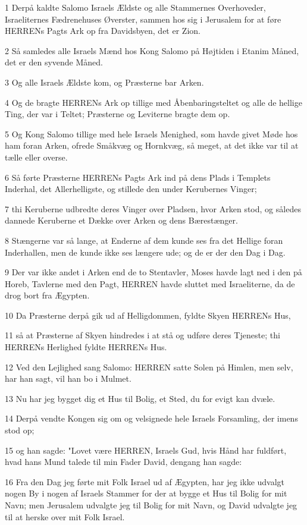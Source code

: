 \par 1 Derpå kaldte Salomo Israels Ældste og alle Stammernes Overhoveder, Israeliternes Fædrenehuses Øverster, sammen hos sig i Jerusalem for at føre HERRENs Pagts Ark op fra Davidsbyen, det er Zion.
\par 2 Så samledes alle Israels Mænd hos Kong Salomo på Højtiden i Etanim Måned, det er den syvende Måned.
\par 3 Og alle Israels Ældste kom, og Præsterne bar Arken.
\par 4 Og de bragte HERRENs Ark op tillige med Åbenbaringsteltet og alle de hellige Ting, der var i Teltet; Præsterne og Leviterne bragte dem op.
\par 5 Og Kong Salomo tillige med hele Israels Menighed, som havde givet Møde hos ham foran Arken, ofrede Småkvæg og Hornkvæg, så meget, at det ikke var til at tælle eller overse.
\par 6 Så førte Præsterne HERRENs Pagts Ark ind på dens Plads i Templets Inderhal, det Allerhelligste, og stillede den under Kerubernes Vinger;
\par 7 thi Keruberne udbredte deres Vinger over Pladsen, hvor Arken stod, og således dannede Keruberne et Dække over Arken og dens Bærestænger.
\par 8 Stængerne var så lange, at Enderne af dem kunde ses fra det Hellige foran Inderhallen, men de kunde ikke ses længere ude; og de er der den Dag i Dag.
\par 9 Der var ikke andet i Arken end de to Stentavler, Moses havde lagt ned i den på Horeb, Tavlerne med den Pagt, HERREN havde sluttet med Israeliterne, da de drog bort fra Ægypten.
\par 10 Da Præsterne derpå gik ud af Helligdommen, fyldte Skyen HERRENs Hus,
\par 11 så at Præsterne af Skyen hindredes i at stå og udføre deres Tjeneste; thi HERRENs Herlighed fyldte HERRENs Hus.
\par 12 Ved den Lejlighed sang Salomo: HERREN satte Solen på Himlen, men selv, har han sagt, vil han bo i Mulmet.
\par 13 Nu har jeg bygget dig et Hus til Bolig, et Sted, du for evigt kan dvæle.
\par 14 Derpå vendte Kongen sig om og velsignede hele Israels Forsamling, der imens stod op;
\par 15 og han sagde: "Lovet være HERREN, Israels Gud, hvis Hånd har fuldført, hvad hans Mund talede til min Fader David, dengang han sagde:
\par 16 Fra den Dag jeg førte mit Folk Israel ud af Ægypten, har jeg ikke udvalgt nogen By i nogen af Israels Stammer for der at bygge et Hus til Bolig for mit Navn; men Jerusalem udvalgte jeg til Bolig for mit Navn, og David udvalgte jeg til at herske over mit Folk Israel.
